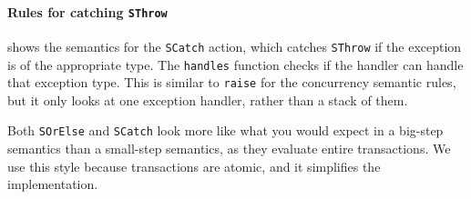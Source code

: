 \paragraph{Rules for catching \texttt{SThrow}}
 shows the semantics for the \verb|SCatch| action,
which catches \verb|SThrow| if the exception is of the appropriate
type.  The \verb|handles| function checks if the handler can handle
that exception type.  This is similar to \verb|raise| for the
concurrency semantic rules, but it only looks at one exception
handler, rather than a stack of them.

Both \verb|SOrElse| and \verb|SCatch| look more like what you would
expect in a big-step semantics than a small-step semantics, as they
evaluate entire transactions.  We use this style because transactions
are atomic, and it simplifies the implementation.

